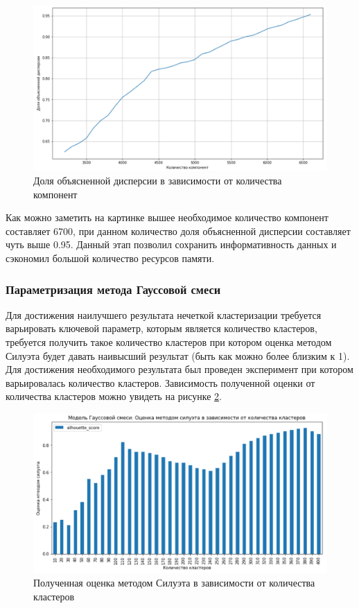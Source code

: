\begin{figure}[H]
	\centering
	\includegraphics[width=\textwidth]{img/ExpVariance.pdf}
	\caption{Доля объясненной дисперсии в зависимости от количества компонент}
	\label{ExpVariance}
\end{figure}  

Как можно заметить на картинке вышее необходимое количество компонент составляет 6700, при данном количество доля объясненной дисперсии составляет чуть выше 0.95. Данный этап позволил сохранить информативность данных и сэкономил большой количество ресурсов памяти.

\subsubsection{Параметризация метода Гауссовой смеси}

Для достижения наилучшего результата нечеткой кластеризации требуется варьировать ключевой параметр, которым является количество кластеров, требуется получить такое количество кластеров при котором оценка методом Силуэта будет давать наивысший результат (быть как можно более близким к 1). Для достижения необходимого результата был проведен эксперимент при котором варьировалась количество кластеров. Зависимость полученной оценки от количества кластеров можно увидеть на рисунке \ref{SilhScore}.

\begin{figure}[H]
	\centering
	\includegraphics[width=\textwidth]{img/SilhScore.pdf}
	\caption{Полученная оценка методом Силуэта в зависимости от количества кластеров}
	\label{SilhScore}
\end{figure}  

